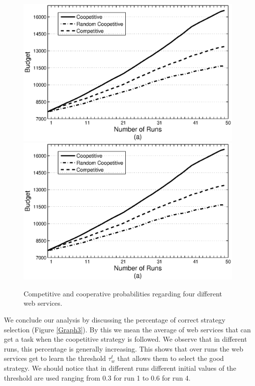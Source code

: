 \documentclass[runningheads,a4paper]{llncs}
\begin{document}
\begin{figure}%
\centering
\includegraphics[scale=0.4]{Graphtest.eps}
\includegraphics[scale=0.4]{Graphtest.eps}
\caption{Competitive and cooperative probabilities regarding four
different web services.} \label{Graph2}
\end{figure}


We conclude our analysis by discussing the percentage of correct
strategy selection (Figure \ref{Graph3}). By this we mean the
average of web services that can get a task when the coopetitive
strategy is followed. We observe that in different runs, this
percentage is generally increasing. This shows that over runs the
web services get to learn the threshold $\tau_w^t$ that allows
them to select the good strategy. We should notice that in
different runs different initial values of the threshold are used
ranging from $0.3$ for run 1 to $0.6$ for run 4.
\end{document}
